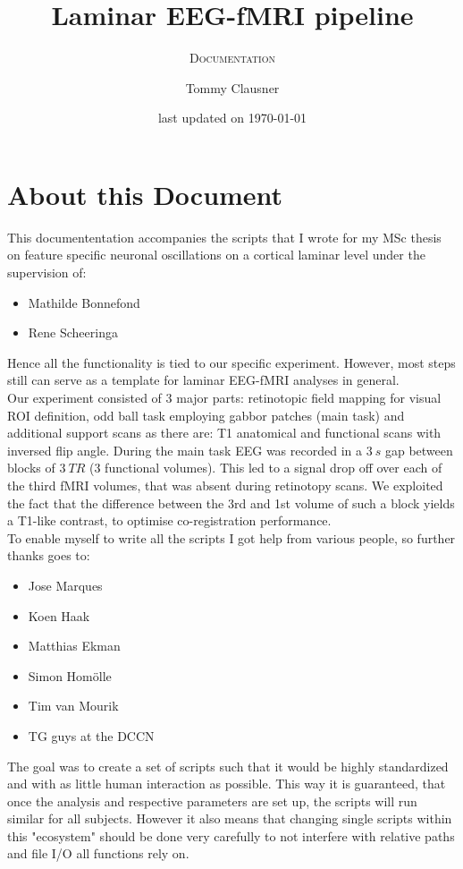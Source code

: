 \documentclass[12pt,a4paper]{scrartcl}
\title{Laminar EEG-fMRI pipeline}
\author{Tommy Clausner}
\subtitle{\textsc{Documentation}}
\date{\small{last updated on \today}}
\begin{document}
\setcounter{secnumdepth}{1}
\begin{titlepage}
\clearpage\maketitle
\thispagestyle{empty}
\end{titlepage}
\tableofcontents
\newpage
\section{About this Document}
\label{sec:about}
This documententation accompanies the scripts that I wrote for my MSc thesis on feature specific neuronal oscillations on a cortical laminar level under the supervision of:
\begin{itemize}
  \item Mathilde Bonnefond
  \item Rene Scheeringa
\end{itemize}
Hence all the functionality is tied to our specific experiment. However, most steps still can serve as a template for laminar EEG-fMRI analyses in general.\\
\noindent Our experiment consisted of 3 major parts: retinotopic field mapping for visual ROI definition, odd ball task employing gabbor patches (main task) and additional support scans as there are: T1 anatomical and functional scans with inversed flip angle. During the main task EEG was recorded in a $3~s$ gap between blocks of $3~TR$ (3 functional volumes). This led to a signal drop off over each of the third fMRI volumes, that was absent during retinotopy scans. We exploited the fact that the difference between the 3rd and 1st volume of such a block yields a T1-like contrast, to optimise co-registration performance.\\
\noindent To enable myself to write all the scripts I got help from various people, so further thanks goes to:
\begin{itemize}
  \item Jose Marques
  \item Koen Haak
  \item Matthias Ekman
  \item Simon Hom\"olle
  \item Tim van Mourik
  \item TG guys at the DCCN
\end{itemize}
The goal was to create a set of scripts such that it would be highly standardized and with as little human interaction as possible. This way it is guaranteed, that once the analysis and respective parameters are set up, the scripts will run similar for all subjects. However it also means that changing single scripts within this "ecosystem" should be done very carefully to not interfere with relative paths and file I/O all functions rely on.
\end{document}
